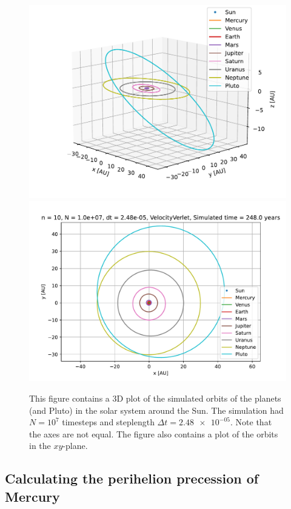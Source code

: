 \documentclass[reprint,english,notitlepage]{revtex4-1}  %
\begin{document}
\begin{figure}[H]
\includegraphics[scale=0.5]{../data/figures/sun_and_friends/ss_248_vv_orbits3D.pdf}
\includegraphics[scale=0.5]{../data/figures/sun_and_friends/ss_248_vv_orbits2D.pdf}
\caption{This figure contains a 3D plot of the simulated orbits of the planets (and Pluto) in the solar system around the Sun. The simulation had $N = 10^7$ timesteps and steplength $\Delta t = \num{2.48e-05}$. Note that the axes are not equal. The figure also contains a plot of the orbits in the $xy$-plane.}
\label{fig:ss}
\end{figure}



\subsection{Calculating the perihelion precession of Mercury} \label{sec:IV:g}
\end{document}

